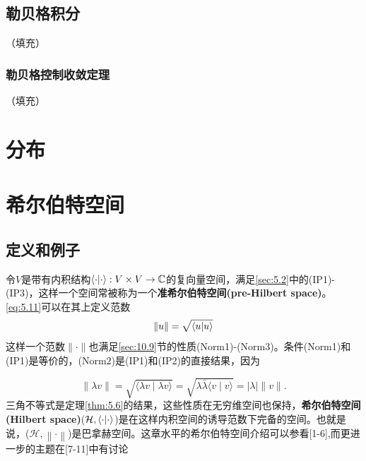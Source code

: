 \documentclass[hyperref,UTF8]{ctexbook}
\begin{document}
\section{勒贝格积分}（填充）
\subsection{勒贝格控制收敛定理}（填充）
\chapter{分布}

\chapter{希尔伯特空间}
\section{定义和例子}
令$V$是带有内积结构\(\braket{\cdot|\cdot}:V\times V\rightarrow\mathbb{C}\)的复向量空间，满足\ref{sec:5.2}中的(IP1)-(IP3)，这样一个空间常被称为一个\textbf{准希尔伯特空间(pre-Hilbert space)}。\ref*{eq:5.11}可以在其上定义范数
\[\left\lVert u\right\rVert =\sqrt{\braket{u|u}}\]
这样一个范数\(\lVert \cdot\rVert \)也满足\ref{sec:10.9}节的性质(Norm1)-(Norm3)。条件(Norm1)和(IP1)是等价的，(Norm2)是(IP1)和(IP2)的直接结果，因为

\begin{equation}
    \|\lambda v\|=\sqrt{\langle\lambda v \mid \lambda v\rangle}=\sqrt{\lambda \bar{\lambda}\langle v \mid v\rangle}=|\lambda|\|v\| .
\end{equation}
三角不等式是定理\ref{thm:5.6}的结果，这些性质在无穷维空间也保持，\textbf{希尔伯特空间(Hilbert space)}(\(\mathcal{H},\braket{\cdot|\cdot}\))是在这样内积空间的诱导范数下完备的空间。也就是说，(\(\mathcal{H},\left\lVert \cdot\right\rVert \))是巴拿赫空间。这章水平的希尔伯特空间介绍可以参看[1-6],而更进一步的主题在[7-11]中有讨论
\end{document}
